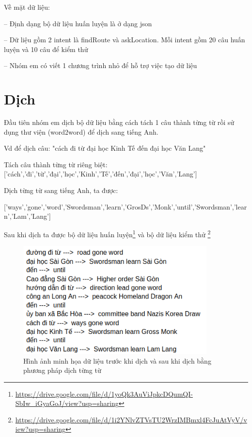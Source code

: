 Về mặt dữ liệu:

-- Định dạng bộ dữ liệu huấn luyện là ở dạng json

-- Dữ liệu gồm 2 intent là findRoute và askLocation. Mỗi intent gồm 20 câu huấn luyện và 10 câu để kiểm thử

-- Nhóm em có viết 1 chương trình nhỏ để hỗ trợ việc tạo dữ liệu



\section{Dịch}

	Đầu tiên nhóm em dịch bộ dữ liệu bằng cách tách 1 câu thành từng từ rồi sử dụng thư viện (word2word) để dịch sang tiếng Anh.
	
	Vd để dịch câu: "cách đi từ đại học Kinh Tế đến đại học Văn Lang"
	
	Tách câu thành từng từ riêng biệt:
		['cách','đi','từ','đại','học','Kinh','Tế','đến','đại','học','Văn','Lang']
	
	Dịch từng từ sang tiếng Anh, ta được:
	
['ways','gone','word','Swordsman','learn','GrosDs','Monk','until','Swordsman','learn','Lam','Lang']
	
	Sau khi dịch ta được bộ dữ liệu huấn luyện\footnote{\url{https://drive.google.com/file/d/1yoQk3AuViJpkcDQumQI-SbIw_iGyaGoJ/view?usp=sharing}} và bộ dữ liệu kiểm thử \footnote{\url{https://drive.google.com/file/d/1i2YNlvZTVsTU2WrzIMBmxl4FcJuAtVyV/view?usp=sharing}}
	 \begin{figure}[htp]
              \centering
              \includegraphics[width=10cm]{images/trainingdata_dichtungtu.png} 
              \caption{Hình ảnh minh họa dữ liệu trước khi dịch và sau khi dịch bằng phương pháp dịch từng từ}
              \label{fig:sodohethongchiduong}

          \end{figure} 


